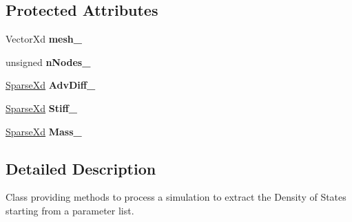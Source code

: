 \subsection*{Protected Attributes}
\begin{DoxyCompactItemize}
\item 
\hypertarget{classPdeSolver_ac0185cf9f8cdf64273950a48d63df3f7}{Vector\-Xd {\bfseries mesh\-\_\-}}\label{classPdeSolver_ac0185cf9f8cdf64273950a48d63df3f7}

\item 
\hypertarget{classPdeSolver_a8f4bb43717322579edc12974700aec98}{unsigned {\bfseries n\-Nodes\-\_\-}}\label{classPdeSolver_a8f4bb43717322579edc12974700aec98}

\item 
\hypertarget{classPdeSolver_a2febd884c8758db9fd346a40d81671eb}{\hyperlink{typedefs_8h_a86edf437f454f4dd79d5422366403b7f}{Sparse\-Xd} {\bfseries Adv\-Diff\-\_\-}}\label{classPdeSolver_a2febd884c8758db9fd346a40d81671eb}

\item 
\hypertarget{classPdeSolver_a63de5de1757c8bc5cd0941030f9794e3}{\hyperlink{typedefs_8h_a86edf437f454f4dd79d5422366403b7f}{Sparse\-Xd} {\bfseries Stiff\-\_\-}}\label{classPdeSolver_a63de5de1757c8bc5cd0941030f9794e3}

\item 
\hypertarget{classPdeSolver_aa0e70aa868721f4bbf1fe7ec57e097a9}{\hyperlink{typedefs_8h_a86edf437f454f4dd79d5422366403b7f}{Sparse\-Xd} {\bfseries Mass\-\_\-}}\label{classPdeSolver_aa0e70aa868721f4bbf1fe7ec57e097a9}

\end{DoxyCompactItemize}


\subsection{Detailed Description}
Class providing methods to process a simulation to extract the Density of States starting from a parameter list. 

